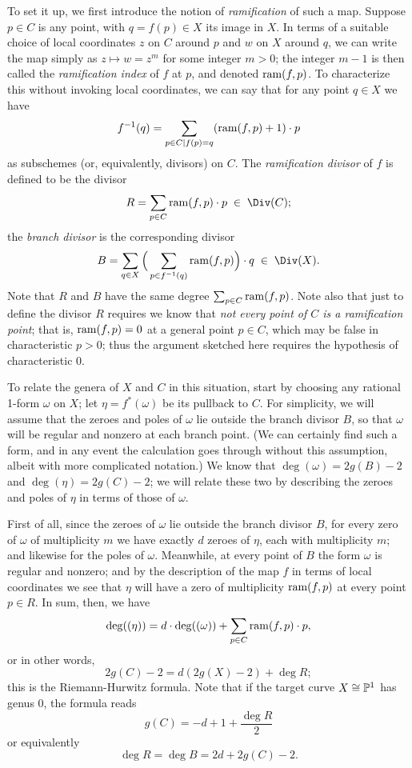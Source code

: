  To set it up, we first introduce the notion of \emph{ramification} of such a map. Suppose $p \in C$ is any point, with $q = f(p) \in X$ its image in $X$. In terms of a suitable choice of local coordinates $z$ on $C$ around $p$ and $w$ on $X$ around $q$, we can write the map simply as $z \mapsto w = z^m$ for some integer $m > 0$; the integer $m-1$ is then called the \emph{ramification index} of $f$ at $p$, and denoted $\ram(f,p)$. To characterize this without invoking local coordinates, we can say that for any point $q \in X$ we have
 $$
 f^{-1}(q) = \sum_{p\in C \mid f(p)=q} (\ram(f,p)+1)\cdot p
 $$
 as subschemes (or, equivalently, divisors) on $C$. The \emph{ramification divisor} of $f$ is defined to be the divisor
 $$
 R = \sum_{p \in C} \ram(f,p)\cdot p \; \in \;  \Div(C);
 $$
 the \emph{branch divisor} is the corresponding divisor
 $$
 B = \sum_{q \in X} \Big(\sum_{p \in f^{-1}(q)} \ram(f,p) \Big)\cdot q \; \in \; \Div(X).
 $$
 Note that $R$ and $B$ have the same degree $\sum_{p \in C} \ram(f,p)$. Note also that just to define the divisor $R$ requires we know that \emph{not every point of $C$ is a ramification point}; that is, $\ram(f,p) = 0$ at a general point $p \in C$, which may be false in characteristic $p > 0$; thus the argument sketched here requires the hypothesis of characteristic 0.
 
 To relate the genera of $X$ and $C$ in this situation, start by choosing any rational 1-form $\omega$ on $X$; let $\eta = f^*(\omega)$ be its pullback to $C$. For simplicity, we will assume that the zeroes and poles of $\omega$ lie outside the branch divisor $B$, so that $\omega$ will be regular and nonzero at each branch point. (We can certainly find such a form, and in any event the calculation goes through without this assumption, albeit with more complicated notation.) We know that $\deg(\omega) = 2g(B) - 2$ and $\deg(\eta) = 2g(C) - 2$; we will relate these two by describing the zeroes and poles of $\eta$ in terms of those of $\omega$.
 
 First of all, since the zeroes of $\omega$ lie outside the branch divisor $B$, for every zero of $\omega$ of multiplicity $m$ we have exactly $d$ zeroes of $\eta$, each with multiplicity $m$; and likewise for the poles of $\omega$. Meanwhile, at every point of $B$ the form $\omega$ is regular and nonzero; and by the description of the map $f$ in terms of local coordinates we see that $\eta$ will have a zero of multiplicity $\ram(f,p)$ at every point $p \in R$. In sum, then, we have
 $$
 \deg((\eta)) = d\cdot \deg((\omega)) + \sum_{p \in C} \ram(f,p) \cdot p,
 $$
 or in other words,
 $$
 2g(C) - 2 = d(2g(X)-2) + \deg R;
  $$
  this is the Riemann-Hurwitz formula. Note that if the target curve $X \cong \PP^1$ has genus 0, the formula reads
  $$
  g(C) = -d  + 1+ \frac{\deg R}{2}
  $$
 or equivalently
 $$
 \deg R = \deg B  = 2d + 2g(C) - 2.
 $$
 
